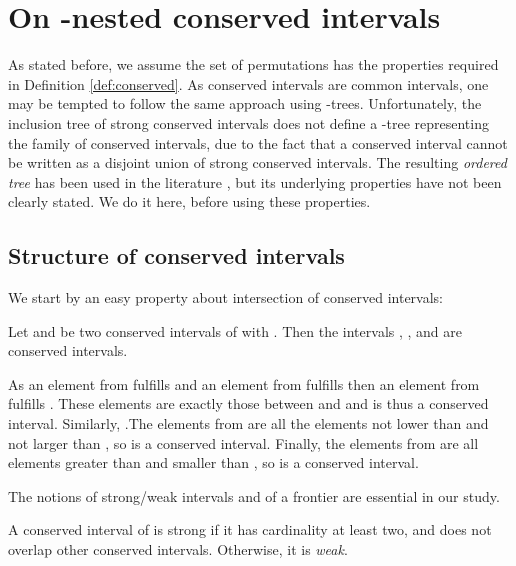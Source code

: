 \documentclass{article}
\begin{document}
\section{On -nested conserved intervals}
\label{sect:conservedtree}

As stated before, we assume the set  of permutations has the properties required in
Definition \ref{def:conserved}. As conserved
intervals are common intervals, one may be tempted to follow the same approach using -trees.
Unfortunately, the inclusion tree of strong conserved intervals does not define a -tree representing
the family of conserved intervals, due to the fact that a  conserved interval  cannot be
written as a disjoint union of strong conserved intervals. The resulting 
{\em ordered tree} has been used in the literature \citet{BergeronBCC04}, but its underlying
properties have not been clearly stated. We do it here, before using these properties.

\subsection{Structure of conserved intervals}

We start by an easy property about intersection of conserved intervals:

\begin{lemma}\label{lemstru2}
Let  and  be two conserved intervals of   with . Then the intervals , ,  and
 are conserved intervals.
\end{lemma}

\begin{preuve}
As an element  from  fulfills  and an element 
from  fulfills  then an element  from  fulfills . These elements are exactly those between 
and  and  is thus a conserved interval. Similarly, 
.The elements from  are all the elements 
not lower than  and not larger than ,  so  is a conserved interval.  
Finally, the elements from  are 
all elements greater than   and smaller than , so  is a conserved
interval. 
\end{preuve}

The notions of strong/weak intervals and of a frontier are essential in our study.


\begin{definition}
A conserved interval  of  is {\rm strong} if it has cardinality at least two, and does not overlap
other conserved intervals. Otherwise, it is {\em weak}.
\end{definition}
\end{document}
